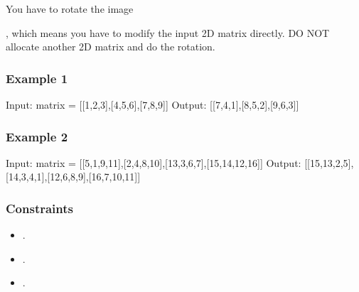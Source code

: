 \documentclass[letterpaper,12pt,english]{book}
\begin{document}
\sphinxAtStartPar
You have to rotate the image %
\begin{footnote}[8]\sphinxAtStartFootnote
{}
%
\end{footnote}, which means you have to modify the input 2D matrix directly. DO NOT allocate another 2D matrix and do the rotation.


\subsubsection{Example 1}
\label{\detokenize{Array/01_ARR_48_Rotate_Image:example-1}}
\sphinxAtStartPar
{}

\begin{sphinxVerbatim}[commandchars=\\\{\}]
Input: matrix = [[1,2,3],[4,5,6],[7,8,9]]
Output: [[7,4,1],[8,5,2],[9,6,3]]
\end{sphinxVerbatim}


\subsubsection{Example 2}
\label{\detokenize{Array/01_ARR_48_Rotate_Image:example-2}}
\sphinxAtStartPar
{}

\begin{sphinxVerbatim}[commandchars=\\\{\}]
Input: matrix = [[5,1,9,11],[2,4,8,10],[13,3,6,7],[15,14,12,16]]
Output: [[15,13,2,5],[14,3,4,1],[12,6,8,9],[16,7,10,11]]
\end{sphinxVerbatim}


\subsubsection{Constraints}
\label{\detokenize{Array/01_ARR_48_Rotate_Image:constraints}}\begin{itemize}
\item {} 
\sphinxAtStartPar
{}.

\item {} 
\sphinxAtStartPar
{}.

\item {} 
\sphinxAtStartPar
{}.

\end{itemize}
\end{document}
